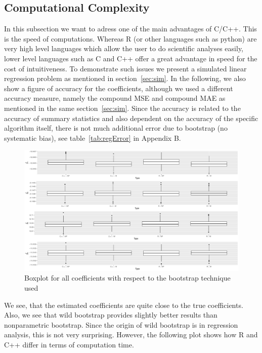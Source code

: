 \subsection{Computational Complexity}

In this subsection we want to adress one of the main advantages of C/C++. This is the speed of computations. Whereas R (or other languages such as python) are very high level languages which allow the user to do scientific analyses easily, lower level languages such as C and C++ offer a great advantage in speed for the cost of intuitiveness. To demonstrate such issues we present a simulated linear regression problem as mentioned in section~\ref{sec:sim}. In the following, we also show a figure of accuracy for the coefficients, although we used a different accuracy measure, namely the compound MSE and compound MAE as mentioned in the same section~\ref{sec:sim}. Since the accuracy is related to the accuracy of summary statistics and also dependent on the accuracy of the specific algorithm itself, there is not much additional error due to bootstrap (no systematic bias), see table~\ref{tab:regError} in Appendix B. 

\begin{figure}
\centering
	\includegraphics[scale=0.4]{./figures/plot_regression_error.pdf}
	\caption[Boxplot Coefficients]{Boxplot for all coefficients with respect to the bootstrap technique used}
	\label{fig:regErr}
\end{figure}

\noindent We see, that the estimated coefficients are quite close to the true coefficients. Also, we see that wild bootstrap provides slightly better results than nonparametric bootstrap. Since the origin of wild bootstrap is in regression analysis, this is not very surprising. However, the following plot shows how R and C++ differ in terms of computation time.

